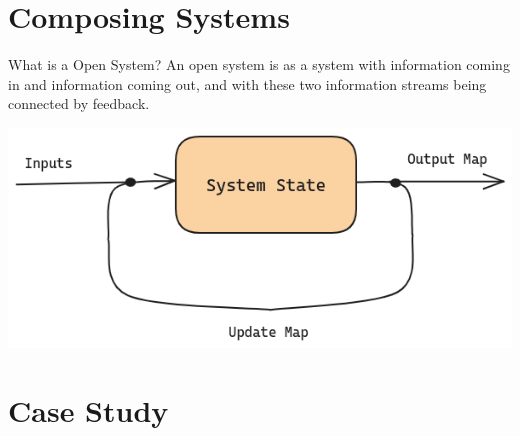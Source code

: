 \documentclass{beamer}
\begin{document}
\section{Composing Systems}
\begin{frame}{What is a Open System?}
    An open system is as a system with information coming in and information coming out, and with these two information streams being connected by feedback.
    \vspace*{0.125in}
    \begin{center}
        \includegraphics[scale=0.35]{system_diagram_open.png}
    \end{center}
\end{frame}



\section{Case Study}
\end{document}
